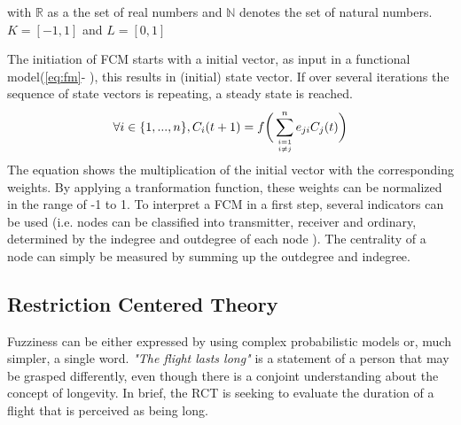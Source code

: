 \documentclass[conference]{IEEEtran}
\begin{document}
with \begin{math} \mathbb{R} \end{math} as a the set of real numbers and \begin{math} \mathbb{N} \end{math} denotes the set of natural numbers. \begin{math} K = [-1,1] \end{math} and \begin{math} L = [0,1] \end{math} \cite{stach2005}

The initiation of FCM starts with a initial vector, as input in a functional model(\ref{eq:fm}- \cite{stach2005}), this results in (initial) state vector. If over several iterations the sequence of state vectors is repeating, a steady state is reached.  
\begin{equation}\label{eq:fm}
\forall i \in \{1,...,n\},C_{i}(t+1) = f  \bigg(\sum_{i=1 \atop i \neq j}^{n} e_{ji}C_{j}(t)\bigg)
\end{equation}
The equation shows the multiplication of the initial vector with the corresponding weights. By applying a tranformation function, these weights can be normalized in the range of -1 to 1. To interpret a FCM in a first step, several indicators can be used (i.e. nodes can be classified into transmitter, receiver and ordinary, determined by the indegree and outdegree of each node \cite{ozesmi2004}). The centrality of a node can simply be measured by summing up the outdegree and indegree.

\subsection{Restriction Centered Theory}
\label{subsec:rct}
Fuzziness can be either expressed by using complex probabilistic models or, much simpler, a single word. \emph{"The flight lasts long"} is a statement of a person that may be grasped differently, even though there is a conjoint understanding about the concept of longevity. In brief, the RCT is seeking to evaluate the duration of a flight that is perceived as being long.
\end{document}
